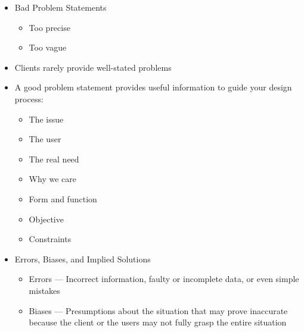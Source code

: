 \begin{itemize}
\begin{itemize}
    \end{itemize}

  \item Bad Problem Statements

    \begin{itemize}

      \item Too precise

      \item Too vague

    \end{itemize}

  \item Clients rarely provide well-stated problems

  \item A good problem statement provides useful information to guide your design process:

    \begin{itemize}

      \item The issue

      \item The user

      \item The real need

      \item Why we care

      \item Form and function

      \item Objective

      \item Constraints

    \end{itemize}

  \item Errors, Biases, and Implied Solutions

    \begin{itemize}

      \item Errors — Incorrect information, faulty or incomplete data, or even simple mistakes

      \item Biases — Presumptions about the situation that may prove inaccurate because the client or the users may not fully grasp the entire situation

        \begin{itemize}


\end{itemize}
\end{itemize}
\end{itemize}
